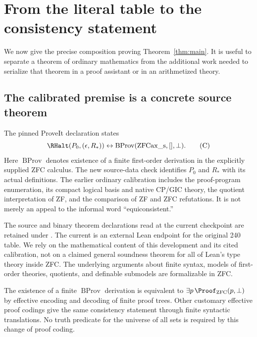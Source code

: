 \section{From the literal table to the consistency statement}
\label{sec:endpoint}

We now give the precise composition proving Theorem~\ref{thm:main}.
It is useful to separate a theorem of ordinary mathematics from the
additional work needed to serialize that theorem in a proof assistant
or in an arithmetized theory.

\subsection{The calibrated premise is a concrete source theorem}

The pinned ProveIt declaration
 states
\[
 \RHalt(P_0,(\epsilon,R_*))
 \leftrightarrow
 \operatorname{BProv}(\mathrm{ZFCax\_s},[],\bot).
\tag{C}
\]
Here $\operatorname{BProv}$ denotes existence of a finite first-order
derivation in the explicitly supplied ZFC calculus. The new source-data
check identifies $P_0$ and $R_*$ with its actual definitions. The
earlier ordinary calibration includes the proof-program enumeration,
its compact logical basis and native CP/GIC theory, the quotient
interpretation of ZF, and the comparison of ZF and ZFC refutations.
It is not merely an appeal to the informal word ``equiconsistent.\cite{calibration,upstream-settheory}''

The source and binary theorem declarations read at the current checkpoint
are retained under . The current
 is an external
Lean endpoint for the original 240 table. We rely on the mathematical
content of this development and its cited calibration, not on a claimed
general soundness theorem for all of Lean's type theory inside ZFC.
The underlying arguments about finite syntax, models of first-order
theories, quotients, and definable submodels are formalizable in ZFC.

The existence of a finite $\operatorname{BProv}$ derivation is equivalent
to $\exists p\,\Proof_{\mathrm{ZFC}}(p,\bot)$ by effective encoding
and decoding of finite proof trees. Other customary effective proof
codings give the same consistency statement through finite syntactic
translations. No truth predicate for the universe of all sets is
required by this change of proof coding.

